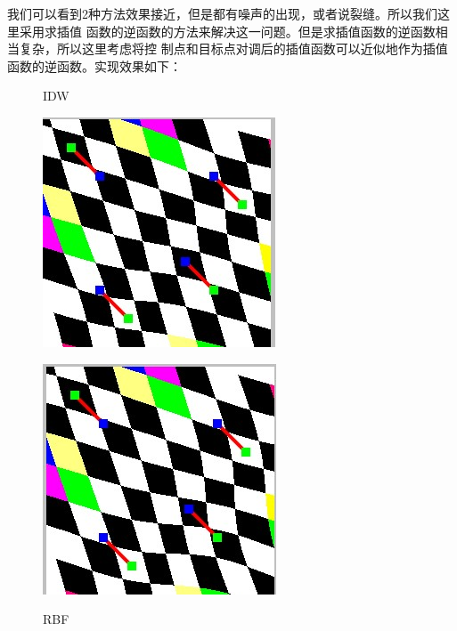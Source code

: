 \documentclass{article}
\begin{document}
	我们可以看到2种方法效果接近，但是都有噪声的出现，或者说裂缝。所以我们这里采用求插值
	函数的逆函数的方法来解决这一问题。但是求插值函数的逆函数相当复杂，所以这里考虑将控
	制点和目标点对调后的插值函数可以近似地作为插值函数的逆函数。实现效果如下：
		\begin{figure}[htbp]
		\centering
		\begin{minipage}{0.4\linewidth}
			\centering
			\caption{IDW}
			\includegraphics[width=1\linewidth]{IDWde.jpg}
			\label{chutian1}
		\end{minipage}
		\begin{minipage}{0.4\linewidth}
			\centering
			\caption{RBF}
			\includegraphics[width=1\linewidth]{RBFde.jpg}
			\label{chutian2}
		\end{minipage}
	\end{figure}
\end{document}
